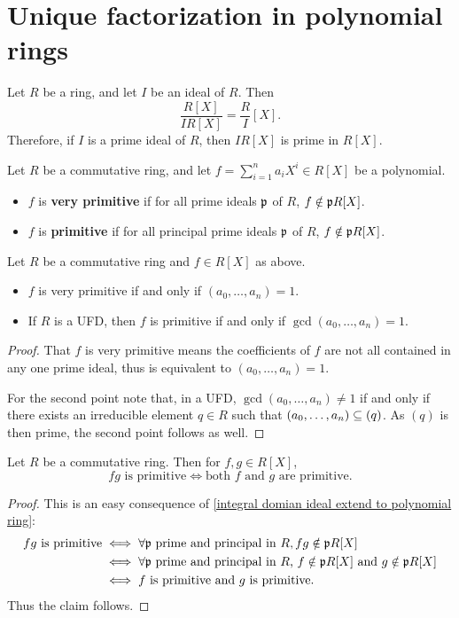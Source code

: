 \section{Unique factorization in polynomial rings}
\begin{lemma}\label{integral domian ideal extend to polynomial ring}
Let $R$ be a ring, and let $I$ be an ideal of $R$. Then
\[\frac{R[X]}{IR[X]}=\frac{R}{I}[X].\]
Therefore, if $I$ is a prime ideal of $R$, then $IR[X]$ is prime in $R[X]$.
\end{lemma}
\begin{definition}
Let $R$ be a commutative ring, and let $f=\sum_{i=1}^{n}a_iX^i\in R[X]$ be a polynomial.
\begin{itemize}
\item $f$ is \textbf{very primitive} if for all prime ideals $\mathfrak{p}$ of $R$, $f\notin\mathfrak{p} R[X]$.
\item $f$ is \textbf{primitive} if for all principal prime ideals $\mathfrak{p}$ of $R$, $f\notin\mathfrak{p} R[X]$.
\end{itemize}
\end{definition}
\begin{lemma}
Let $R$ be a commutative ring and $f\in R[X]$ as above.
\begin{itemize}
\item $f$ is very primitive if and only if $(a_0,\dots,a_n)=1$.
\item If $R$ is a UFD, then $f$ is primitive if and only if $\gcd(a_0,\dots,a_n)=1$.
\end{itemize}
\end{lemma}
\begin{proof}
That $f$ is very primitive means the coefficients of $f$ are not all contained in any one prime ideal, thus is equivalent to $(a_0,\dots,a_n)=1$.\par
For the second point note that, in a UFD, $\gcd(a_0,\dots,a_n)\neq1$ if and only if there exists an irreducible element $q\in R$ such that $(a_0,\dots,a_n)\subseteq(q)$. As $(q)$ is then prime, the second point follows as well.
\end{proof}
\begin{lemma}\label{polynomial product is primitive iff}
Let $R$ be a commutative ring. Then for $f,g\in R[X]$,
\[\text{$fg$ is primitive}\iff\text{both $f$ and $g$ are primitive}.\]
\end{lemma}
\begin{proof}
This is an easy consequence of \cref{integral domian ideal extend to polynomial ring}:
\begin{align*}
\text{$fg$ is primitive}&\iff\text{$\forall\mathfrak{p}$ prime and principal in $R,fg\notin\mathfrak{p} R[X]$}\\
&\iff\text{$\forall\mathfrak{p}$ prime and principal in $R$, $f\notin\mathfrak{p} R[X]$ and $g\notin\mathfrak{p} R[X]$}\\
&\iff\text{$f$ is primitive and $g$ is primitive}.
\end{align*}
Thus the claim follows.
\end{proof}
